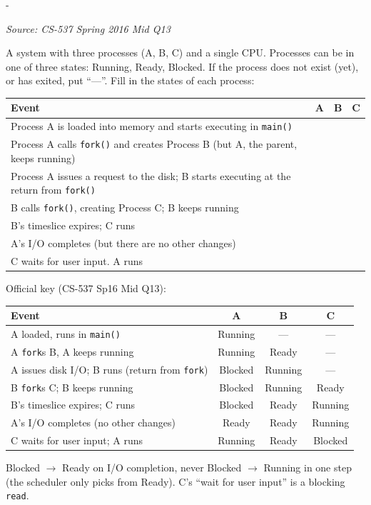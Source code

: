 \documentclass[11pt,a4paper]{article}
\makeatletter
\newcommand{\keepspace}[1]{\par\penalty-100\begingroup
  \setlength{\dimen@}{#1}\dimen@ii\pagegoal\advance\dimen@ii-\pagetotal
  \ifdim\dimen@>\dimen@ii\ifdim\dimen@ii>\z@\vfil\fi\break\fi\endgroup}
\newcounter{qn}[section]
\newenvironment{Qn}[4]{%
  \refstepcounter{qn}\keepspace{7\baselineskip}%
  \begin{tcolorbox}[qboxstyle, title={Q\thesection.\theqn\ \ [#1 \textbar\ #2]\ \ #4}]%
  {\footnotesize\color{g3}\textit{Source: #3}}\par\smallskip%
}{%
  \end{tcolorbox}%
}
\newenvironment{Sol}{%
  \begin{tcolorbox}[sboxstyle, title={Solution}]%
}{%
  \end{tcolorbox}\vspace{0.35em}%
}
\makeatother
\begin{document}
\begin{Qn}{Medium-Hard}{Lect 2--3}{CS-537 Spring 2016 Mid Q13}{Fill in Running / Ready / Blocked through forks and I/O}
A system with three processes (A, B, C) and a single CPU. Processes can be in one of three states: Running, Ready, Blocked. If the process does not exist (yet), or has exited, put ``---''. Fill in the states of each process:
\begin{center}
\begin{tabular}{p{}ccc}
\hline
Event & A & B & C \\
\hline
Process A is loaded into memory and starts executing in \texttt{main()} & & & \\
Process A calls \texttt{fork()} and creates Process B (but A, the parent, keeps running) & & & \\
Process A issues a request to the disk; B starts executing at the return from \texttt{fork()} & & & \\
B calls \texttt{fork()}, creating Process C; B keeps running & & & \\
B's timeslice expires; C runs & & & \\
A's I/O completes (but there are no other changes) & & & \\
C waits for user input. A runs & & & \\
\hline
\end{tabular}
\end{center}
\end{Qn}
\begin{Sol}
Official key (CS-537 Sp16 Mid Q13):
\begin{center}
\begin{tabular}{lccc}
\hline
Event & A & B & C \\
\hline
A loaded, runs in \texttt{main()}
  & Running & --- & --- \\
A \texttt{fork}s B, A keeps running
  & Running & Ready & --- \\
A issues disk I/O; B runs (return from \texttt{fork})
  & Blocked & Running & --- \\
B \texttt{fork}s C; B keeps running
  & Blocked & Running & Ready \\
B's timeslice expires; C runs
  & Blocked & Ready & Running \\
A's I/O completes (no other changes)
  & Ready & Ready & Running \\
C waits for user input; A runs
  & Running & Ready & Blocked \\
\hline
\end{tabular}
\end{center}
Blocked $\to$ Ready on I/O completion, never Blocked $\to$ Running in one step (the scheduler only picks from Ready). C's ``wait for user input'' is a blocking \texttt{read}.
\end{Sol}
\end{document}
